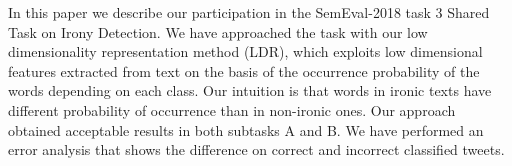 In this paper we describe our participation in the SemEval-2018 task 3 Shared Task on Irony Detection. We have approached the task with our low dimensionality representation method (LDR), which exploits low dimensional features extracted from text on the basis of the occurrence probability of the words depending on each class. Our intuition is that words in ironic texts have different probability of occurrence than in non-ironic ones. Our approach obtained acceptable results in both subtasks A and B. We have performed an error analysis that shows the difference on correct and incorrect classified tweets.
